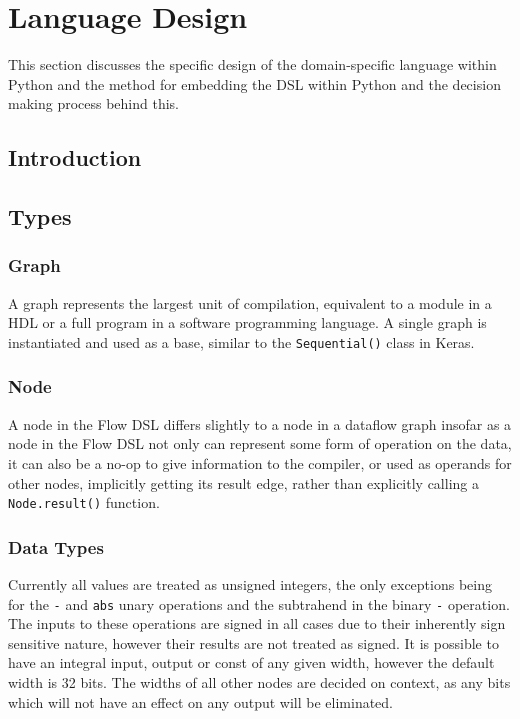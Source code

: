 \chapter{Language Design}\label{chap:embedding}

This section discusses the specific design of the domain-specific language within Python and the method for embedding the DSL within Python and the decision making process behind this.

\section{Introduction}

\section{Types}
\subsection{Graph}
A graph represents the largest unit of compilation, equivalent to a module in a HDL or a full program in a software programming language. A single graph is instantiated and used as a base, similar to the \lstinline|Sequential()| class in Keras.

\subsection{Node}
A node in the Flow DSL differs slightly to a node in a dataflow graph insofar as a node in the Flow DSL not only can represent some form of operation on the data, it can also be a no-op to give information to the compiler, or used as operands for other nodes, implicitly getting its result edge, rather than explicitly calling a \lstinline|Node.result()| function.

\subsection{Data Types}
Currently all values are treated as unsigned integers, the only exceptions being for the \lstinline|-| and \lstinline|abs| unary operations and the subtrahend in the binary \lstinline|-| operation. The inputs to these operations are signed in all cases due to their inherently sign sensitive nature, however their results are not treated as signed. It is possible to have an integral input, output or const of any given width, however the default width is 32 bits. The widths of all other nodes are decided on context, as any bits which will not have an effect on any output will be eliminated.

